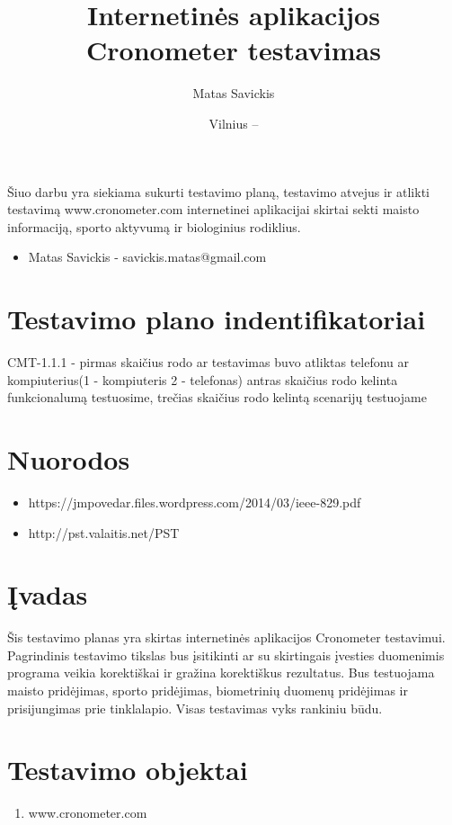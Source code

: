 \documentclass[oneside]{VUMIFPSkursinis}
\title{Internetinės aplikacijos Cronometer testavimas}
\author{Matas Savickis}
\date{Vilnius – \the\year}
\begin{document}
\maketitle

Šiuo darbu yra siekiama sukurti testavimo planą, testavimo atvejus ir atlikti testavimą www.cronometer.com  internetinei aplikacijai skirtai sekti maisto informaciją, sporto aktyvumą ir biologinius rodiklius.

\begin{itemize}
	\item{Matas Savickis - savickis.matas@gmail.com}
\end{itemize}

\tableofcontents

\section{Testavimo plano indentifikatoriai} CMT-1.1.1 - pirmas skaičius rodo ar testavimas buvo atliktas telefonu ar kompiuterius(1 - kompiuteris 2 - telefonas) antras skaičius rodo kelinta funkcionalumą testuosime, trečias skaičius rodo kelintą scenarijų testuojame
\section{Nuorodos}
	\begin{itemize}
		\item{https://jmpovedar.files.wordpress.com/2014/03/ieee-829.pdf}
		\item{http://pst.valaitis.net/PST}
	\end{itemize}
\section{Įvadas}
	Šis testavimo planas yra skirtas internetinės aplikacijos Cronometer testavimui. Pagrindinis testavimo tikslas bus įsitikinti ar su skirtingais įvesties duomenimis programa veikia korektiškai ir gražina korektiškus rezultatus. Bus testuojama maisto pridėjimas, sporto pridėjimas, biometrinių duomenų pridėjimas ir prisijungimas prie tinklalapio. Visas testavimas vyks rankiniu būdu.

\section{Testavimo objektai}
	\begin{enumerate}
		\item{www.cronometer.com}
	\end{enumerate}
\end{document}
